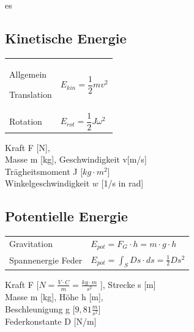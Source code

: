 es\documentclass[a4paper, fontsize=8pt, landscape]{scrartcl}
\begin{document}
\begin{multicols*}{4}
\subsection{Kinetische Energie}

    \begin{tabular}[t]{@{}l l}
    
    Allgemein 
    
    Translation & \rule{0pt}{18pt} $E_{kin} = \dfrac{1}{2}mv^2$  \\
    
    Rotation  & \rule{0pt}{18pt} $E_{rot} = \dfrac{1}{2}J\omega^2$\\
    
    \end{tabular}
    \vspace{3em}
    
    \noindent
    Kraft F [N], \\
    Masse m [kg], Geschwindigkeit v[m/s]\\
    Trägheitsmoment J [$kg \cdot m^2$]\\ Winkelgeschwindigkeit $w$ [1/s in rad]\\


\subsection{Potentielle Energie}

    \renewcommand{\arraystretch}{1.6}
    \begin{tabular}[t]{@{}l l}
    
    
    Gravitation & $E_{pot} = F_G\cdot h = m\cdot g\cdot h$ \\
    
    Spannenergie Feder & $E_{pot} = \int_S D s\cdot ds = \frac{1}{2}Ds^2$
    
    \end{tabular}
    \vspace{3em}
    
    \noindent
    Kraft F [$N = \frac{V \cdot C}{m} = \frac{kg \cdot m}{s^2}$ ], Strecke s [m]\\
    Masse m [kg], Höhe h [m], \\
    Beschleunigung g [$9,81 \frac{m}{s^2}$]\\
    Federkonstante D [N/m]




\end{multicols*}
\end{document}
